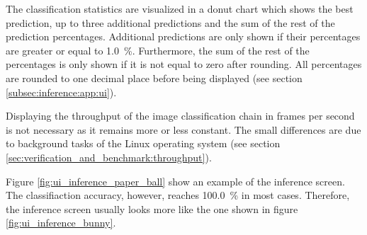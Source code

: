 The classification statistics are visualized in a donut chart which shows the best prediction, up to three additional predictions and the sum of the rest of the prediction percentages.
Additional predictions are only shown if their percentages are greater or equal to \SI{1.0}{\percent}.
Furthermore, the sum of the rest of the percentages is only shown if it is not equal to zero after rounding.
All percentages are rounded to one decimal place before being displayed (see section \ref{subsec:inference:app:ui}).

Displaying the throughput of the image classification chain in frames per second is not necessary as it remains more or less constant.
The small differences are due to background tasks of the Linux operating system (see section \ref{sec:verification_and_benchmark:throughput}).

Figure \ref{fig:ui_inference_paper_ball} show an example of the inference screen.
The classifiaction accuracy, however, reaches \SI{100.0}{\percent} in most cases.
Therefore, the inference screen usually looks more like the one shown in figure \ref{fig:ui_inference_bunny}.

